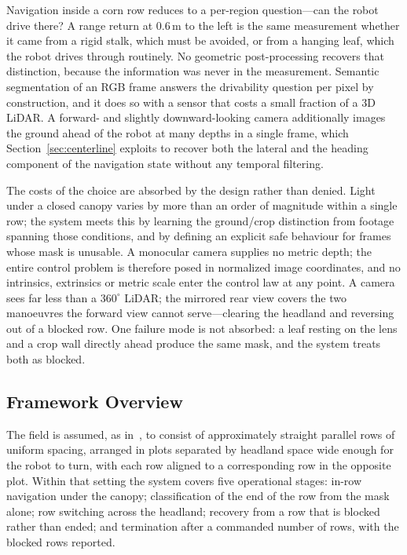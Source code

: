 \documentclass[conference]{IEEEtran}
\begin{document}
Navigation inside a corn row reduces to a per-region question---can the robot
drive there? A range return at 0.6\,m to the left is the same measurement
whether it came from a rigid stalk, which must be avoided, or from a hanging
leaf, which the robot drives through routinely. No geometric post-processing
recovers that distinction, because the information was never in the measurement.
Semantic segmentation of an RGB frame answers the drivability question per pixel
by construction, and it does so with a sensor that costs a small fraction of a
3D LiDAR. A forward- and slightly downward-looking camera additionally images
the ground ahead of the robot at many depths in a single frame, which
Section~\ref{sec:centerline} exploits to recover both the lateral and the
heading component of the navigation state without any temporal filtering.

The costs of the choice are absorbed by the design rather than denied. Light
under a closed canopy varies by more than an order of magnitude within a single
row; the system meets this by learning the ground/crop distinction from footage
spanning those conditions, and by defining an explicit safe behaviour for frames
whose mask is unusable. A monocular camera supplies no metric depth; the entire
control problem is therefore posed in normalized image coordinates, and no
intrinsics, extrinsics or metric scale enter the control law at any point. A
camera sees far less than a $360^{\circ}$ LiDAR; the mirrored rear view covers
the two manoeuvres the forward view cannot serve---clearing the headland and
reversing out of a blocked row. One failure mode is not absorbed: a leaf resting
on the lens and a crop wall directly ahead produce the same mask, and the system
treats both as blocked.

\subsection{Framework Overview}
The field is assumed, as in~\cite{kim2025pagnav}, to consist of approximately
straight parallel rows of uniform spacing, arranged in plots separated by
headland space wide enough for the robot to turn, with each row aligned to a
corresponding row in the opposite plot. Within that setting the system covers
five operational stages: in-row navigation under the canopy; classification of
the end of the row from the mask alone; row switching across the headland;
recovery from a row that is blocked rather than ended; and termination after a
commanded number of rows, with the blocked rows reported.
\end{document}
